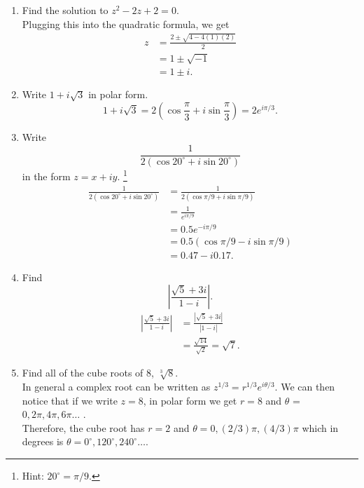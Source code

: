 \documentclass{article}
\begin{document}
\begin{enumerate}
{	}
	\item{Find the solution to $z^2 - 2z + 2 = 0$. \\
		Plugging this into the quadratic formula, we get 
		\begin{align*}
			z &= \frac{2 \pm \sqrt{4 - 4(1)(2)}}{2} \\
			&= 1 \pm \sqrt{-1} \\
			&= 1 \pm i.
		\end{align*}			
	}
	\item{Write $1+i\sqrt{3}$ in polar form.
		\begin{equation*}
			1 + i \sqrt{3} = 2\left( \cos \frac{\pi}{3} + i \sin \frac{\pi}{3} \right) = 2e^{i\pi/3}.
		\end{equation*}	
	}	
	\item{Write 
		\begin{equation*}
			\frac{1}{2 (\cos 20^\circ + i \sin 20^\circ)}
		\end{equation*}		
		in the form $z = x+iy$. \footnote{Hint: $20^\circ = \pi/9$.}	
		\begin{align*}
			\frac{1}{2 (\cos 20^\circ + i \sin 20^\circ)} &= \frac{1}{2 (\cos \pi/9 + i \sin \pi/9)} \\
			&= \frac{1}{e^{i\pi/9}} \\
			&= 0.5 e^{-i\pi/9} \\
			&= 0.5(\cos \pi/9 - i \sin \pi/9) \\
			&= 0.47 - i 0.17 .
		\end{align*}
	}
	\item{Find 
		\begin{equation*}
			\left| \frac{\sqrt{5} + 3i}{1-i} \right| .
		\end{equation*}			
		\begin{align*}
			\left| \frac{\sqrt{5} + 3i}{1-i} \right| &= \frac{|\sqrt{5} + 3i|}{|1-i|} \\
			&= \frac{\sqrt{14}}{\sqrt{2}} = \sqrt{7} .
		\end{align*}
	}
	\item{Find all of the cube roots of 8, $\sqrt[3]{8}$. \\
		In general a complex root can be written as $z^{1/3} = r^{1/3} e^{i\theta /3}$.  We can then notice that if we write $z=8$, in polar form we get $r=8$ and $\theta$ = $0, 2\pi, 4\pi, 6\pi \ldots$ . \\
		Therefore, the cube root has $r=2$ and $\theta = 0, (2/3)\pi, (4/3)\pi$ which in degrees is $\theta = 0^\circ, 120^\circ, 240^\circ \ldots$. \\
}
\end{enumerate}
\end{document}
